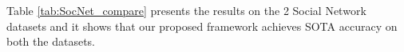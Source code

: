 Table \ref{tab:SocNet_compare} presents the results on the 2 Social Network datasets and it shows that our proposed framework achieves SOTA accuracy on both the datasets.





